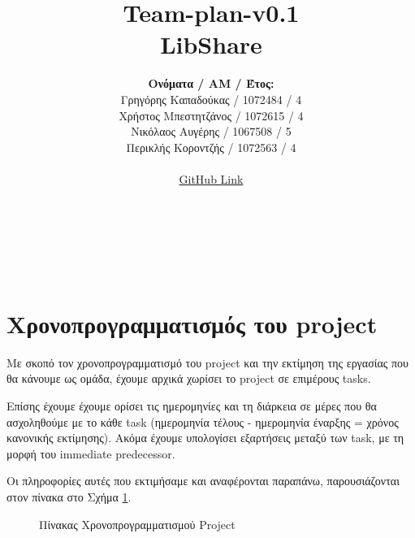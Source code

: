 \documentclass[12pt,a4paper]{article}
\title{Team-plan-v0.1 \\ LibShare}
\author{\textbf{Ονόματα / ΑΜ / Έτος:} \\ Γρηγόρης Καπαδούκας / 1072484 / 4\textdegree \\ Χρήστος Μπεστητζάνος / 1072615 / 4\textdegree \\ Νικόλαος Αυγέρης / 1067508 / 5\textdegree \\ Περικλής Κοροντζής / 1072563 / 4\textdegree\\ \\ \href{https://github.com/GregKapadoukas/University-Software-Engineering-Project}{GitHub Link}}
\begin{document}
\makeatletter
\begin{center}
	\LARGE{\@title} \\
	\pagebreak
\end{center}
\begin{LARGE}\@author\end{LARGE} \\
\pagebreak

\section{Χρονοπρογραμματισμός του project}
Με σκοπό τον χρονοπρογραμματισμό του project και την εκτίμηση της εργασίας που θα κάνουμε ως ομάδα, έχουμε αρχικά χωρίσει το project σε επιμέρους tasks.

Επίσης έχουμε έχουμε ορίσει τις ημερομηνίες και τη διάρκεια σε μέρες που θα ασχοληθούμε με το κάθε task (ημερομηνία τέλους - ημερομηνία έναρξης = χρόνος κανονικής εκτίμησης). Ακόμα έχουμε υπολογίσει εξαρτήσεις μεταξύ των task, με τη μορφή του immediate predecessor.

Οι πληροφορίες αυτές που εκτιμήσαμε και αναφέρονται παραπάνω, παρουσιάζονται στον πίνακα στο Σχήμα \ref{Πίνακας Χρονοπρογραμματισμού Project}.

\begin{figure}[H]
	\caption{Πίνακας Χρονοπρογραμματισμού Project}
	\label{Πίνακας Χρονοπρογραμματισμού Project}
\end{figure}
\end{document}
